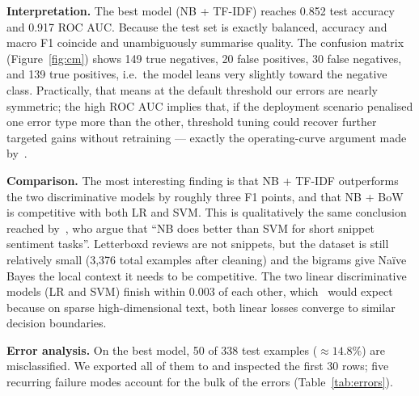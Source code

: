 \documentclass[11pt]{article}
\begin{document}
\textbf{Interpretation.} The best model (NB + TF-IDF) reaches 0.852 test accuracy and 0.917 ROC AUC. Because the test set is exactly balanced, accuracy and macro F1 coincide and unambiguously summarise quality. The confusion matrix (Figure~\ref{fig:cm}) shows 149 true negatives, 20 false positives, 30 false negatives, and 139 true positives, i.e.\ the model leans very slightly toward the negative class. Practically, that means at the default threshold our errors are nearly symmetric; the high ROC AUC implies that, if the deployment scenario penalised one error type more than the other, threshold tuning could recover further targeted gains without retraining --- exactly the operating-curve argument made by~\citet{pang_lee_2008}.

\textbf{Comparison.} The most interesting finding is that NB + TF-IDF outperforms the two discriminative models by roughly three F1 points, and that NB + BoW is competitive with both LR and SVM. This is qualitatively the same conclusion reached by~\citet{wang_manning_2012}, who argue that ``NB does better than SVM for short snippet sentiment tasks''. Letterboxd reviews are not snippets, but the dataset is still relatively small (3{,}376 total examples after cleaning) and the bigrams give Na\"ive Bayes the local context it needs to be competitive. The two linear discriminative models (LR and SVM) finish within 0.003 of each other, which~\citet{joachims_1998} would expect because on sparse high-dimensional text, both linear losses converge to similar decision boundaries.

\textbf{Error analysis.} On the best model, 50 of 338 test examples ($\approx 14.8\%$) are misclassified. We exported all of them to  and inspected the first 30 rows; five recurring failure modes account for the bulk of the errors (Table~\ref{tab:errors}).
\end{document}

